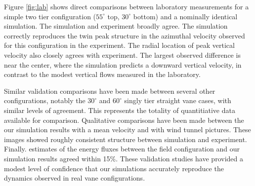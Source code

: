 Figure \ref{fig:lab} shows direct comparisons between laboratory measurements for a simple 
two tier configuration ($55^{\circ}$ top, $30^{\circ}$ bottom) and 
a nominally identical simulation. The simulation and experiment broadly agree. The simulation 
correctly reproduces the twin peak structure in the azimuthal velocity 
observed for this configuration in the experiment. The radial location of peak vertical velocity also 
closely agrees with experiment. The largest observed difference is near the center, where the simulation predicts 
a downward vertical velocity, in contrast to the modest vertical flows measured in the laboratory. 

Similar validation comparisons have been made between several other configurations, notably the $30^{\circ}$ 
and $60^{\circ}$ singly tier straight vane cases, with similar levels of agreement. 
This represents the totality of quantitiative data available for comparison. Qualitative comparisons have been made
between the our simulation results with a mean velocity and with wind tunnel pictures. These images showed
roughly consistent structure between simulation and experiment. Finally. estimates of the energy fluxes between
the field configuration and our simulation results agreed within 15\%. These validation studies have provided a modest 
level of confidence that our simulations accurately reproduce the dynamics observed in real vane configurations. 

%
%

